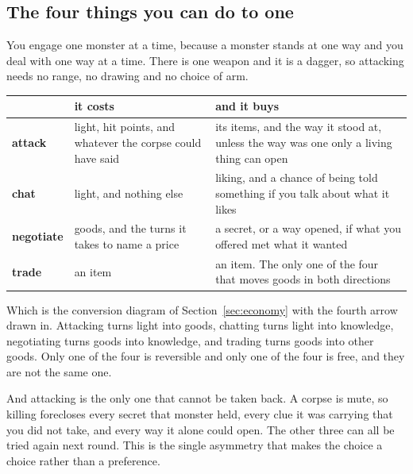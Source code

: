 \documentclass[11pt,a4paper]{article}
\begin{document}
\subsection{The four things you can do to one}

You engage one monster at a time, because a monster stands at one way and you deal with one way at
a time. There is one weapon and it is a dagger, so attacking needs no range, no drawing and no
choice of arm.

\begin{center}
\begin{tabular}{@{}l@{\hspace{3mm}}>{\raggedright\arraybackslash}p{}@{\hspace{3mm}}>{\raggedright\arraybackslash}p{}@{}}
\toprule
& \textbf{it costs} & \textbf{and it buys} \\
\midrule
\textbf{attack}    & light, hit points, and whatever the corpse could have said &
its items, and the way it stood at, unless the way was one only a living thing can open \\[1mm]
\textbf{chat}      & light, and nothing else &
liking, and a chance of being told something if you talk about what it likes \\[1mm]
\textbf{negotiate} & goods, and the turns it takes to name a price &
a secret, or a way opened, if what you offered met what it wanted \\[1mm]
\textbf{trade}     & an item &
an item. The only one of the four that moves goods in both directions \\
\bottomrule
\end{tabular}
\end{center}

\begin{sectionbox}
Which is the conversion diagram of Section~\ref{sec:economy} with the fourth arrow drawn in.
Attacking turns light into goods, chatting turns light into knowledge, negotiating turns goods into
knowledge, and trading turns goods into other goods. Only one of the four is reversible and only
one of the four is free, and they are not the same one.
\end{sectionbox}

\begin{alarmbox}
And attacking is the only one that cannot be taken back. A corpse is mute, so killing forecloses
every secret that monster held, every clue it was carrying that you did not take, and every way it
alone could open. The other three can all be tried again next round. This is the single asymmetry
that makes the choice a choice rather than a preference.
\end{alarmbox}
\end{document}
